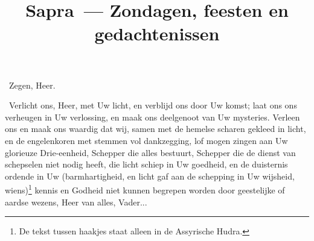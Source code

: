 \documentclass[12pt,twoside,a5paper]{article}
\begin{document}
\title{Sapra~--- Zondagen, feesten en gedachtenissen}
\author{}
\date{}
\maketitle


\begin{halfparskip}
\dd~Zegen, Heer.

\cc~Verlicht ons, Heer, met Uw licht, en verblijd ons door Uw komst; laat ons ons verheugen in Uw verlossing, en maak ons deelgenoot van Uw mysteries. Verleen ons en maak ons waardig dat wij, samen met de hemelse scharen gekleed in licht, en de engelenkoren met stemmen vol dankzegging, lof mogen zingen aan Uw glorieuze Drie-eenheid, Schepper die alles bestuurt, Schepper die de dienst van schepselen niet nodig heeft, die licht schiep in Uw goedheid, en de duisternis ordende in Uw (barmhartigheid, en licht gaf aan de schepping in Uw wijsheid, wiens)\footnote{De tekst tussen haakjes staat alleen in de Assyrische Hudra.} kennis en Godheid niet kunnen begrepen worden door geestelijke of aardse wezens, Heer van alles, Vader... 
\end{halfparskip}

\end{document}
